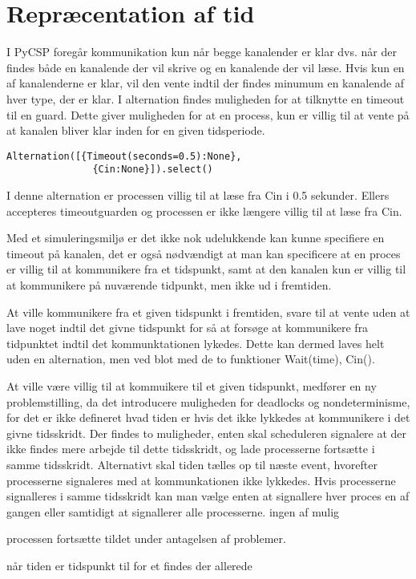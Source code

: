 \section{Repræcentation af tid}

I PyCSP foregår kommunikation kun når begge kanalender er klar dvs.
når der findes både en kanalende der vil skrive og en kanalende der vil læse. 
Hvis kun en af kanalenderne er klar, vil den vente indtil
der findes minumum en kanalende af hver type, der er klar. I alternation 
findes muligheden for at tilknytte en timeout til en guard. Dette
giver muligheden for at en process, kun er villig til at vente på at kanalen 
bliver klar inden for en given tidsperiode. 
\begin{lstlisting}[label=Timeout,
  caption=Timeout i Alternation (fra dokumentationen til PyCSP)]
  Alternation([{Timeout(seconds=0.5):None},
               {Cin:None}]).select()
\end{lstlisting} 

I denne alternation er processen villig til at læse fra Cin i 0.5 sekunder. 
Ellers accepteres timeoutguarden og processen er ikke længere villig til at 
læse fra Cin.

Med et simuleringsmiljø er det ikke nok udelukkende kan kunne specifiere en 
timeout på kanalen, det er også nødvændigt at man kan specificere at en proces 
er villig til at kommunikere fra et tidspunkt, samt at den kanalen kun er 
villig til at kommunikere på nuværende tidpunkt, men ikke ud i fremtiden. 

At ville kommunikere fra et given tidspunkt i fremtiden,  svare til at vente 
uden at lave noget indtil det givne tidspunkt for så at forsøge at kommunikere 
fra tidpunktet indtil det kommunktationen lykedes. Dette kan dermed laves helt 
uden en alternation, men ved blot med de to funktioner Wait(time), Cin(). 

At ville være villig til at kommuikere til et given tidspunkt, medfører en ny 
problemstilling, da det introducere muligheden for deadlocks og 
nondeterminisme, for det er ikke defineret hvad tiden 
er hvis det ikke lykkedes at kommunikere i det givne tidsskridt. Der findes to 
muligheder, enten skal scheduleren signalere at der ikke findes mere arbejde 
til dette tidsskridt, og lade processerne fortsætte i samme tidsskridt. 
Alternativt skal tiden tælles op til næste event, hvorefter processerne 
signaleres med at kommunkationen ikke lykkedes. Hvis processerne signalleres 
i samme tidsskridt kan man vælge enten at signallere hver proces en af gangen 
eller samtidigt at signallerer alle processerne. ingen af mulig

processen fortsætte  tildet under antagelsen af problemer.




når tiden er  tidspunkt
til for et findes der allerede  
